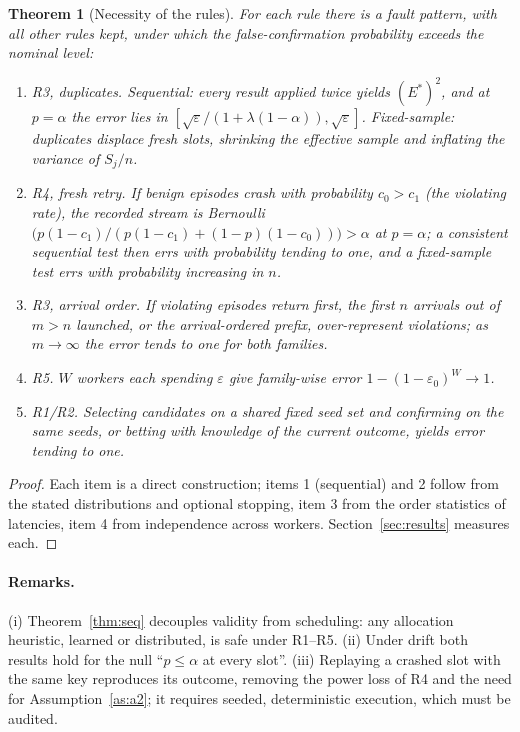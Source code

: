 \documentclass[pdflatex,sn-mathphys-num]{sn-jnl}
\theoremstyle{thmstyleone}
\newtheorem{theorem}{Theorem}
\theoremstyle{thmstyletwo}
\theoremstyle{thmstylethree}
\begin{document}
\begin{theorem}[Necessity of the rules]\label{thm:necessity}
For each rule there is a fault pattern, with all other rules kept, under which the false-confirmation probability exceeds the nominal level:
\begin{enumerate}
\item \emph{R3, duplicates.} Sequential: every result applied twice yields $(E^*)^2$, and at $p=\alpha$ the error lies in $[\sqrt\varepsilon/(1+\lambda(1-\alpha)),\sqrt\varepsilon]$. Fixed-sample: duplicates displace fresh slots, shrinking the effective sample and inflating the variance of $S_j/n$.
\item \emph{R4, fresh retry.} If benign episodes crash with probability $c_0>c_1$ (the violating rate), the recorded stream is Bernoulli$\bigl(p(1-c_1)/(p(1-c_1)+(1-p)(1-c_0))\bigr)>\alpha$ at $p=\alpha$; a consistent sequential test then errs with probability tending to one, and a fixed-sample test errs with probability increasing in $n$.
\item \emph{R3, arrival order.} If violating episodes return first, the first $n$ arrivals out of $m>n$ launched, or the arrival-ordered prefix, over-represent violations; as $m\to\infty$ the error tends to one for both families.
\item \emph{R5.} $W$ workers each spending $\varepsilon$ give family-wise error $1-(1-\varepsilon_0)^W\to1$.
\item \emph{R1/R2.} Selecting candidates on a shared fixed seed set and confirming on the same seeds, or betting with knowledge of the current outcome, yields error tending to one.
\end{enumerate}
\end{theorem}
\begin{proof}
Each item is a direct construction; items 1 (sequential) and 2 follow from the stated distributions and optional stopping, item 3 from the order statistics of latencies, item 4 from independence across workers. Section~\ref{sec:results} measures each.
\end{proof}

\paragraph{Remarks.} (i) Theorem~\ref{thm:seq} decouples validity from scheduling: any allocation heuristic, learned or distributed, is safe under R1--R5. (ii) Under drift both results hold for the null ``$p\le\alpha$ at every slot''. (iii) Replaying a crashed slot with the same key reproduces its outcome, removing the power loss of R4 and the need for Assumption~\ref{as:a2}; it requires seeded, deterministic execution, which must be audited.
\end{document}

